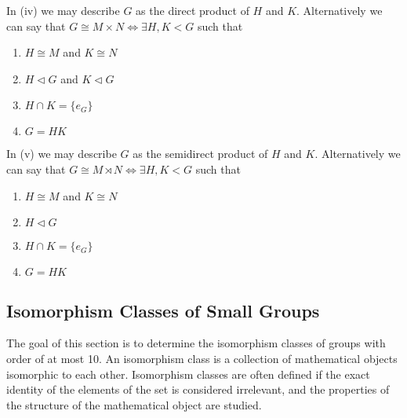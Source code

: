 \begin{remark}
   In (iv) we may describe \(G\) as the direct product of \(H\) and \(K\).
   Alternatively we can say that
   \(G \cong M \times N \iff \exists H, K < G\) such that
   \begin{enumerate}[label=\roman*, align=Center]
      \item \(H \cong M\) and \(K \cong N\)
      \item \(H \triangleleft G\) and \(K \triangleleft G\)
      \item \(H \cap K = \{e_G\}\)
      \item \(G = HK\)
   \end{enumerate}

   In (v) we may describe \(G\) as the semidirect product of \(H\) and \(K\).
   Alternatively we can say that
   \(G \cong M \rtimes N \iff \exists H, K < G\) such that
   \begin{enumerate}[label=\roman*, align=Center]
      \item \(H \cong M\) and \(K \cong N\)
      \item \(H \triangleleft G\)
      \item \(H \cap K = \{e_G\}\)
      \item \(G = HK\)
   \end{enumerate}
\end{remark}

\subsection{Isomorphism Classes of Small Groups}
The goal of this section is to determine the isomorphism classes of groups with order of at most 10.
An isomorphism class is a collection of mathematical objects isomorphic to each other.
Isomorphism classes are often defined if the exact identity of the elements of the set is considered irrelevant, and the properties of the structure of the mathematical object are studied.

